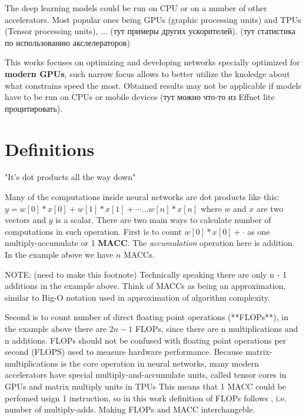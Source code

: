 The deep learning models could be run on CPU or on a number of other accelerators. Most popular ones being GPUs (graphic processing units) and TPUs (Tensor processing units), ... (тут примеры других ускорителей). (тут статистика по использованию акслелераторов)

This works focuses on optimizing and developing networks specially optimized for \textbf{modern GPUs}, such narrow focus allows to better utilize the knoledge about what constrains speed the most. Obtained results may not be applicable if models have to be run on CPUs or mobile devices (тут можно что-то из Effnet lite процитировать). 




\section{Definitions}

"It’s dot products all the way down" 

Many of the computations inside neural networks are dot products like this: $y = w[0]*x[0] + w[1]*x[1] + \cdots \ldots w[n] * x[n]$ where $w$ and $x$ are two vectors and $y$ is a scalar. There are two main ways to calculate number of computations in such operation. First is to count $ w[0] * x[0] + \cdot $ as one multiply-accumulate or 1 \textbf{MACC}. The \textit{accumulation} operation here is addition. In the example above we have $n$ MACCs. 


NOTE: (need to make this footnote)
Technically speaking there are only n - 1 additions in the example above. Think of MACCs as being an approximation, similar to Big-O notation used in approximation of algorithm complexity.

Second is to count number of direct floating point operations (**FLOPs**), in the example above there are $2n - 1$ FLOPs, since there are n multiplications and n additions. FLOPs should not be confused with floating point operations per second (FLOPS) used to measure hardware performance. Because matrix-multiplications is the core operation in neural networks, many modern accelerators have special multiply-and-accumulate units, called tensor cores 
in GPUs and matrix multiply units in TPUs %
This means that 1 MACC could be perfomed usign 1 instruction, so in this work definition of FLOPs follows \cite{zhang2018_shufflenet}, i.e. number of multiply-adds. Making FLOPs and MACC interchangeble.

